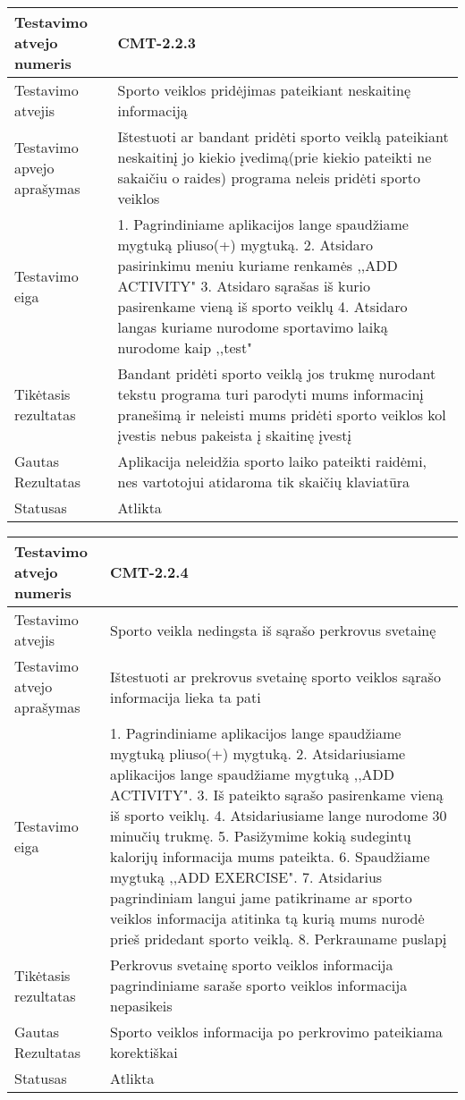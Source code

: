 \documentclass[oneside]{VUMIFPSkursinis}
\begin{document}
\begin{center}
    \begin{tabular}{ |p{5cm}|p{13cm}|}
    \hline
    	Testavimo atvejo numeris & CMT-2.2.3 \\ \hline
    	Testavimo atvejis &Sporto veiklos pridėjimas pateikiant neskaitinę informaciją \\ \hline
	Testavimo apvejo aprašymas & Ištestuoti ar bandant pridėti sporto veiklą pateikiant neskaitinį jo kiekio įvedimą(prie kiekio pateikti ne sakaičiu o raides) programa neleis pridėti sporto veiklos  \\ \hline
	Testavimo eiga & 1. Pagrindiniame aplikacijos lange spaudžiame mygtuką pliuso(+) mygtuką. 
				2. Atsidaro pasirinkimu meniu kuriame renkamės ,,ADD ACTIVITY"
				3. Atsidaro sąrašas iš kurio pasirenkame vieną iš sporto veiklų
				4. Atsidaro langas kuriame nurodome sportavimo laiką nurodome kaip ,,test" \\ \hline
	Tikėtasis rezultatas & Bandant pridėti sporto veiklą jos trukmę nurodant tekstu programa turi parodyti mums informacinį pranešimą ir neleisti mums pridėti sporto veiklos kol įvestis nebus pakeista į skaitinę įvestį \\ \hline
	Gautas Rezultatas & Aplikacija neleidžia sporto laiko pateikti raidėmi, nes vartotojui atidaroma tik skaičių klaviatūra \\ \hline
	Statusas & Atlikta \\ \hline
    \hline
    \end{tabular}
\end{center}

\begin{center}
    \begin{tabular}{ |p{5cm}|p{13cm}|}
    \hline
        Testavimo atvejo numeris & CMT-2.2.4  \\ \hline
        Testavimo atvejis & Sporto veikla nedingsta iš sąrašo perkrovus svetainę  \\ \hline
        Testavimo atvejo aprašymas & Ištestuoti ar prekrovus svetainę sporto veiklos sąrašo informacija lieka ta pati  \\ \hline
        Testavimo eiga &  1. Pagrindiniame aplikacijos lange spaudžiame mygtuką pliuso(+) mygtuką. 
				2. Atsidariusiame aplikacijos lange spaudžiame mygtuką ,,ADD ACTIVITY". 
				3. Iš pateikto sąrašo pasirenkame vieną iš sporto veiklų. 
				4. Atsidariusiame lange nurodome 30 minučių trukmę.
				5. Pasižymime kokią sudegintų kalorijų informacija mums pateikta. 
				6. Spaudžiame mygtuką ,,ADD EXERCISE".
				7. Atsidarius pagrindiniam langui jame patikriname ar sporto veiklos informacija atitinka tą kurią mums nurodė prieš pridedant sporto veiklą.
				8. Perkrauname puslapį\\ \hline
        Tikėtasis rezultatas &  Perkrovus svetainę sporto veiklos informacija pagrindiniame saraše sporto veiklos informacija nepasikeis\\ \hline
        Gautas Rezultatas & Sporto veiklos informacija po perkrovimo pateikiama korektiškai  \\ \hline
        Statusas & Atlikta  \\ \hline
    \hline
    \end{tabular}
\end{center}
\end{document}
